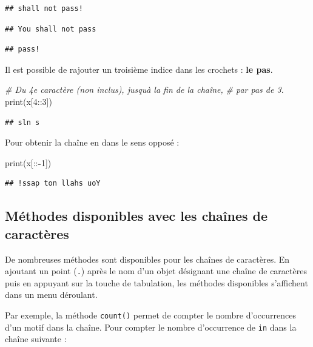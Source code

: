 \documentclass[
  12pt,
]{book}
\newenvironment{Shaded}{\begin{snugshade}}{\end{snugshade}}
\newcommand{\BuiltInTok}[1]{#1}
\newcommand{\CommentTok}[1]{\textcolor[rgb]{0.56,0.35,0.01}{\textit{#1}}}
\newcommand{\DecValTok}[1]{\textcolor[rgb]{0.00,0.00,0.81}{#1}}
\newcommand{\NormalTok}[1]{#1}
\newcommand{\OperatorTok}[1]{\textcolor[rgb]{0.81,0.36,0.00}{\textbf{#1}}}
\numberwithin{equation}{section}
\numberwithin{countremarque}{section}
\begin{document}
\begin{lstlisting}
## shall not pass!
\end{lstlisting}

\begin{lstlisting}
## You shall not pass
\end{lstlisting}

\begin{lstlisting}
## pass!
\end{lstlisting}

Il est possible de rajouter un troisième indice dans les crochets : \textbf{le pas}.

\begin{Shaded}
\begin{Highlighting}[]
\CommentTok{\# Du 4e caractère (non inclus), jusqu\textquotesingle{}à la fin de la chaîne,}
\CommentTok{\# par pas de 3.}
\BuiltInTok{print}\NormalTok{(x[}\DecValTok{4}\NormalTok{::}\DecValTok{3}\NormalTok{])}
\end{Highlighting}
\end{Shaded}

\begin{lstlisting}
## sln s
\end{lstlisting}

Pour obtenir la chaîne en dans le sens opposé :

\begin{Shaded}
\begin{Highlighting}[]
\BuiltInTok{print}\NormalTok{(x[::}\OperatorTok{{-}}\DecValTok{1}\NormalTok{])}
\end{Highlighting}
\end{Shaded}

\begin{lstlisting}
## !ssap ton llahs uoY
\end{lstlisting}

\subsection{Méthodes disponibles avec les chaînes de caractères}\label{muxe9thodes-disponibles-avec-les-chauxeenes-de-caractuxe8res}

De nombreuses méthodes sont disponibles pour les chaînes de caractères. En ajoutant un point (\texttt{.}) après le nom d'un objet désignant une chaîne de caractères puis en appuyant sur la touche de tabulation, les méthodes disponibles s'affichent dans un menu déroulant.

Par exemple, la méthode \texttt{count()} permet de compter le nombre d'occurrences d'un motif dans la chaîne. Pour compter le nombre d'occurrence de \texttt{in} dans la chaîne suivante :
\end{document}
